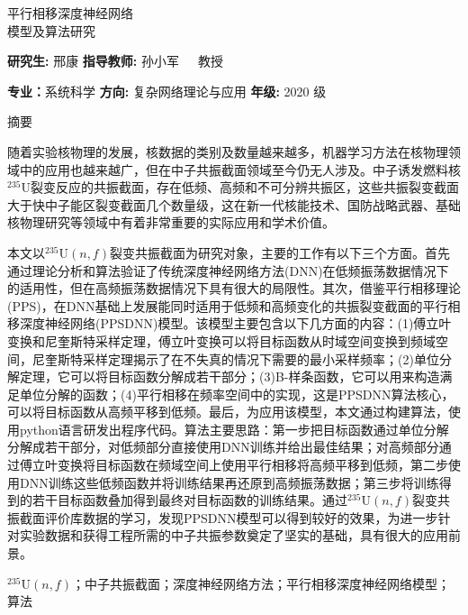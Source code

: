 \begin{center}
{\erhao\heiti 平行相移深度神经网络\\\vspace{0.2cm}模型及算法研究}\\
\end{center}
\vspace{0.7cm}
\centerline{\normalsize{\songti\xiaosihao\textbf{\heiti 研究生:}
\hspace{10pt}邢康}\hspace{20pt} \normalsize{ \songti\xiaosihao\textbf{\heiti 指导教师:}
\hspace{10pt}孙小军~~~教授}}
\centerline{\normalsize{ \songti\textbf{\heiti 专业：}系统科学\quad}\normalsize{ \songti\textbf{\heiti 方向: }复杂网络理论与应用\quad}\normalsize{ \songti\textbf{\heiti 年级: } 2020 级} }
\vspace{0.5cm}
\centerline{\heiti\sanhao 摘\quad 要}
\vspace{0.1cm}
\par
随着实验核物理的发展，核数据的类别及数量越来越多，机器学习方法在核物理领域中的应用也越来越广，但在中子共振截面领域至今仍无人涉及。中子诱发燃料核$^{235}$U裂变反应的共振截面，存在低频、高频和不可分辨共振区，这些共振裂变截面大于快中子能区裂变截面几个数量级，这在新一代核能技术、国防战略武器、基础核物理研究等领域中有着非常重要的实际应用和学术价值。

本文以$^{235}\text{U}(n,f)$裂变共振截面为研究对象，主要的工作有以下三个方面。首先通过理论分析和算法验证了传统深度神经网络方法(DNN)在低频振荡数据情况下的适用性，但在高频振荡数据情况下具有很大的局限性。其次，借鉴平行相移理论(PPS)，在DNN基础上发展能同时适用于低频和高频变化的共振裂变截面的平行相移深度神经网络(PPSDNN)模型。该模型主要包含以下几方面的内容：(1)傅立叶变换和尼奎斯特采样定理，傅立叶变换可以将目标函数从时域空间变换到频域空间，尼奎斯特采样定理揭示了在不失真的情况下需要的最小采样频率；(2)单位分解定理，它可以将目标函数分解成若干部分；(3)B-样条函数，它可以用来构造满足单位分解的函数；(4)平行相移在频率空间中的实现，这是PPSDNN算法核心，可以将目标函数从高频平移到低频。最后，为应用该模型，本文通过构建算法，使用python语言研发出程序代码。算法主要思路：第一步把目标函数通过单位分解分解成若干部分，对低频部分直接使用DNN训练并给出最佳结果；对高频部分通过傅立叶变换将目标函数在频域空间上使用平行相移将高频平移到低频，第二步使用DNN训练这些低频函数并将训练结果再还原到高频振荡数据；第三步将训练得到的若干目标函数叠加得到最终对目标函数的训练结果。通过$^{235}\text{U}(n,f)$裂变共振截面评价库数据的学习，发现PPSDNN模型可以得到较好的效果，为进一步针对实验数据和获得工程所需的中子共振参数奠定了坚实的基础，具有很大的应用前景。
\par
\vspace{0.5cm}
$^{235}\text{U}(n,f)$；中子共振截面；深度神经网络方法；平行相移深度神经网络模型；算法